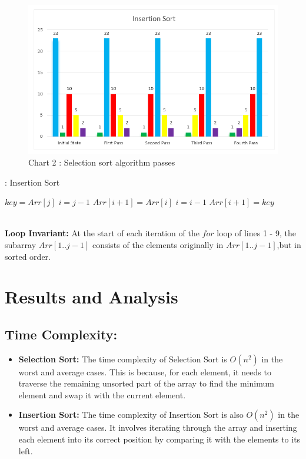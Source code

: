 \documentclass[a4paper,12pt,twocolumn]{article}
\begin{document}
\begin{figure}[!hbt]
    \centering
    \includegraphics[width=\linewidth]{chart2.png}
    \captionsetup{font=small, textfont=it}
    \caption*{Chart 2 : Selection sort algorithm passes}
    \label{fig:chart2}
\end{figure}



\begin{algorithm}[H]
    \caption{: Insertion Sort\cite{cormen2022introduction}}
    \begin{algorithmic}[1]
    \State $key = Arr[j]$
    \State $i = j- 1$
                \State $Arr[i+1]=Arr[i]$
                \State $i=i-1$
        \EndWhile
        \State $Arr[i+1]=key$
    \EndFor
    \end{algorithmic}
\end{algorithm}
\quad\\
\textbf{Loop Invariant:}
At the start of each iteration of the $for$ loop of lines 1 - 9, the subarray $Arr[1..j-1]$ consists of the elements originally in $Arr[1..j-1]$,but in sorted order.\cite{cormen2022introduction}


\section{Results and Analysis}
\subsection*{Time Complexity:}
\begin{itemize}[label=--]
    \item \textbf{Selection Sort:} The time complexity of Selection Sort is \(O(n^2)\) in the worst and average cases. This is because, for each element, it needs to traverse the remaining unsorted part of the array to find the minimum element and swap it with the current element.
    \item \textbf{Insertion Sort:} The time complexity of Insertion Sort is also \(O(n^2)\) in the worst and average cases. It involves iterating through the array and inserting each element into its correct position by comparing it with the elements to its left.
\end{itemize}
\end{document}
